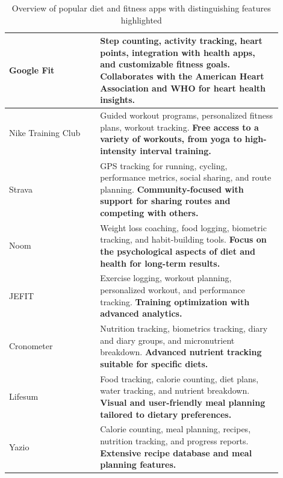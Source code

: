 \begin{table}[h!]
    \centering
    \begin{tabular}{|>{\raggedright\arraybackslash}p{0.3\linewidth}|>{\raggedright\arraybackslash}p{0.6\linewidth}|}
        \hline
        Google Fit         & Step counting, activity tracking, heart points, integration with health apps, and customizable fitness goals. \textbf{Collaborates with the American Heart Association and WHO for heart health insights.} \\
        \hline
        Nike Training Club & Guided workout programs, personalized fitness plans, workout tracking. \textbf{Free access to a variety of workouts, from yoga to high-intensity interval training.}              \\
        \hline
        Strava             & GPS tracking for running, cycling, performance metrics, social sharing, and route planning. \textbf{Community-focused with support for sharing routes and competing with others.}                  \\
        \hline
        Noom               & Weight loss coaching, food logging, biometric tracking, and habit-building tools. \textbf{Focus on the psychological aspects of diet and health for long-term results.}                       \\
        \hline
        JEFIT              & Exercise logging, workout planning, personalized workout, and performance tracking. \textbf{Training optimization with advanced analytics.}                                                 \\
        \hline
        Cronometer         & Nutrition tracking, biometrics tracking, diary and diary groups, and micronutrient breakdown. \textbf{Advanced nutrient tracking suitable for specific diets.}                           \\
        \hline
        Lifesum            & Food tracking, calorie counting, diet plans, water tracking, and nutrient breakdown. \textbf{Visual and user-friendly meal planning tailored to dietary preferences.}                              \\
        \hline
        Yazio              & Calorie counting, meal planning, recipes, nutrition tracking, and progress reports. \textbf{Extensive recipe database and meal planning features.}                                                 \\
        \hline
    \end{tabular}
    \caption{Overview of popular diet and fitness apps with distinguishing features highlighted}
\end{table}
\clearpage

